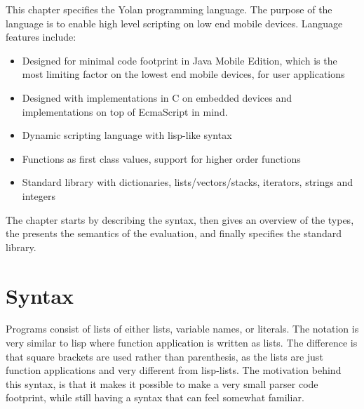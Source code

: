 
This chapter specifies the Yolan programming language.
The purpose of the language is to enable high level scripting on low end mobile devices. Language features include:
\begin{itemize}
\item Designed for minimal code footprint in Java Mobile Edition, which is the most limiting factor on the lowest end mobile devices, for user applications
\item Designed with implementations in C on embedded devices and implementations on top of EcmaScript in mind.
\item Dynamic scripting language with lisp-like syntax
\item Functions as first class values, support for higher order functions
\item Standard library with dictionaries, lists/vectors/stacks, iterators, strings and integers
\end{itemize}

The chapter starts by describing the syntax, then gives an overview of the types, the presents the semantics of the evaluation, and finally specifies the standard library.


\section{Syntax}
Programs consist of lists of either lists, variable names, or literals.
The notation is very similar to lisp where function application is written as lists.
The difference is that square brackets are used rather than parenthesis, 
as the lists are just function applications and very different from lisp-lists.
The motivation behind this syntax, is that it makes it possible to make a very small parser code footprint, while still having a syntax that can feel somewhat familiar.

